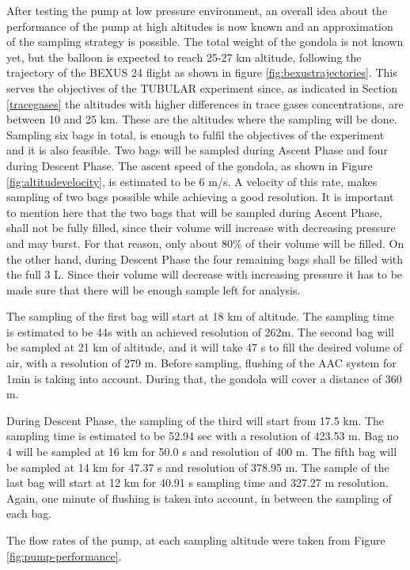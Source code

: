 \documentclass[a4paper,12pt,twoside]{article}
\begin{document}
\begin{appendices}
After testing the pump at low pressure environment, an overall idea about the performance of the pump at high altitudes is now known and an approximation of the sampling strategy is possible.   
The total weight of the gondola is not known yet, but the balloon is expected to reach 25-27 km altitude, following the trajectory of the BEXUS 24 flight as shown in figure \ref{fig:bexustrajectories}. 
This serves the objectives of the TUBULAR experiment since, as indicated in Section \ref{tracegases} the altitudes with higher differences in trace gases concentrations, are between 10 and 25 km. These are the altitudes where the sampling will be done. Sampling six bags in total, is enough to fulfil the objectives of the experiment and it is also feasible. Two bags will be sampled during Ascent Phase and four during Descent Phase. The ascent speed of the gondola, as shown in Figure \ref{fig:altitudevelocity}, is estimated to be 6 m/s. A velocity of this rate, makes sampling of two bags possible while achieving a good resolution. It is important to mention here that the two bags that will be sampled during Ascent Phase, shall not be fully filled, since their volume will increase with decreasing pressure and may burst. For that reason, only about 80\% of their volume will be filled. On the other hand, during Descent Phase the four remaining bags shall be filled with the full 3 L. Since their volume will decrease with increasing pressure it has to be made sure that there will be enough sample left for analysis. 

The sampling of the first bag will start at 18 km of altitude. The sampling time is estimated to be 44s with an achieved resolution of 262m. The second bag will be sampled at 21 km of altitude, and it will take 47 s to fill the desired volume of air, with a resolution of 279 m. Before sampling, flushing of the AAC system for 1min is taking into account. During that, the gondola will cover a distance of 360 m. 

During Descent Phase, the sampling of the third will start from 17.5 km. The sampling time is estimated to be 52.94 sec with a resolution of 423.53 m. Bag no 4 will be sampled at 16 km for 50.0 s and resolution of 400 m. The fifth bag will be sampled at 14 km for 47.37 s and resolution of 378.95 m. The sample of the last bag will start at 12 km for 40.91 s sampling time and 327.27 m resolution. Again, one minute of flushing is taken into account, in between the sampling of each bag.

The flow rates of the pump, at each sampling altitude were taken from Figure \ref{fig:pump-performance}.





\end{appendices}
\end{document}
